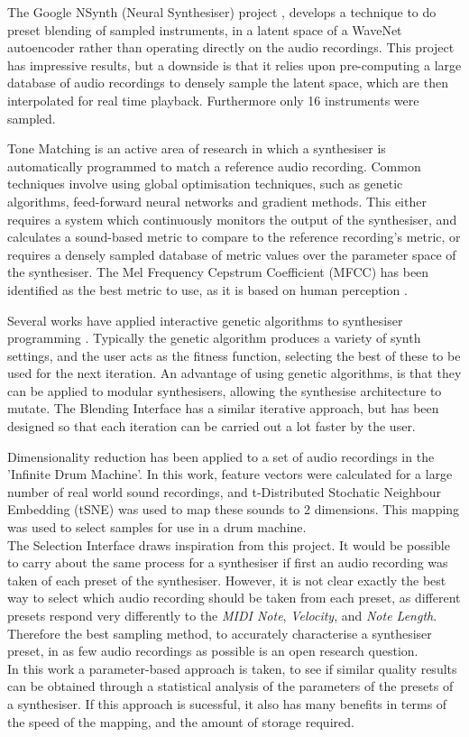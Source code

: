 \documentclass[11pt, oneside]{report}   	%
\begin{document}
The Google NSynth (Neural Synthesiser) project \cite{NSynth}, develops a technique to do preset blending of sampled instruments, in a latent space of a WaveNet autoencoder rather than operating directly on the audio recordings. This project has impressive results, but a downside is that it relies upon pre-computing a large database of audio recordings to densely sample the latent space, which are then interpolated for real time playback. Furthermore only 16 instruments were sampled.

Tone Matching is an active area of research in which a synthesiser is automatically programmed to match a reference audio recording. Common techniques involve using global optimisation techniques, such as genetic algorithms, feed-forward neural networks and gradient methods. This either requires a system which continuously monitors the output of the synthesiser, and calculates a sound-based metric to compare to the reference recording's metric, or requires a densely sampled database of metric values over the parameter space of the synthesiser.  The Mel Frequency Cepstrum Coefficient (MFCC) has been identified as the best metric to use, as it is based on human perception \cite{YeeKing}.

Several works have applied interactive genetic algorithms to synthesiser programming \cite{EvolutionaryInteractive, GenSynth, GenComparison}. Typically the genetic algorithm produces a variety of synth settings, and the user acts as the fitness function, selecting the best of these to be used for the next iteration. An advantage of using genetic algorithms, is that they can be applied to modular synthesisers, allowing the synthesise architecture to mutate. The Blending Interface has a similar iterative approach, but has been designed so that each iteration can be carried out a lot faster by the user. 

Dimensionality reduction has been applied to a set of audio recordings in the 'Infinite Drum Machine'. In this work, feature vectors were calculated for a large number of real world sound recordings, and t-Distributed Stochatic Neighbour Embedding (tSNE) was used to map these sounds to 2 dimensions. This mapping was used to select samples for use in a drum machine. \\
The Selection Interface draws inspiration from this project. It would be possible to carry about the same process for a synthesiser if first an audio recording was taken of each preset of the synthesiser. However, it is not clear exactly the best way to select which audio recording should be taken from each preset, as different presets respond very differently to the \emph{MIDI Note}, \emph{Velocity}, and \emph{Note Length}. Therefore the best sampling method, to accurately characterise a synthesiser preset, in as few audio recordings as possible is an open research question.\\
In this work a parameter-based approach is taken, to see if similar quality results can be obtained through a statistical analysis of the parameters of the presets of a synthesiser. If this approach is sucessful, it also has many benefits in terms of the speed of the mapping, and the amount of storage required.
\end{document}
